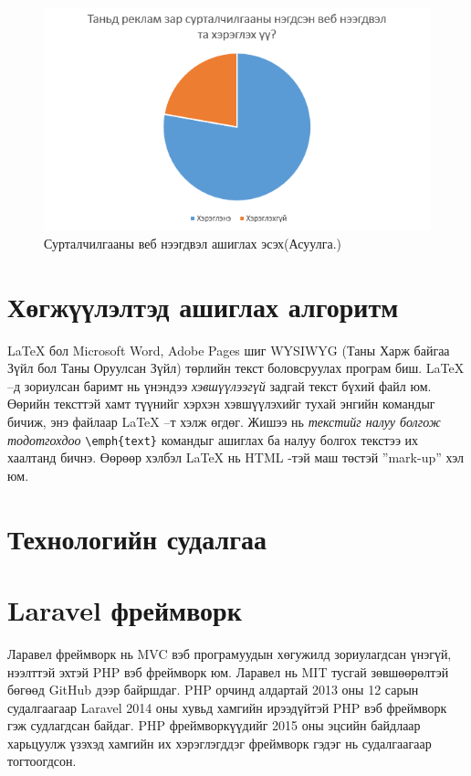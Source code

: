 \begin{figure}[htbp]
	\centering
	\includegraphics[scale=0.7]{Chart/Chart7}
	\caption[Хэрэглэгчийн судалгаа]{Сурталчилгааны веб нээгдвэл ашиглах эсэх(Асуулга.)}
	\label{fig:Chart7}
\end{figure}

\section{Хөгжүүлэлтэд ашиглах алгоритм}

\LaTeX{} бол Microsoft Word, Adobe Pages шиг \textsc{WYSIWYG} (Таны Харж байгаа Зүйл бол Таны Оруулсан Зүйл) төрлийн текст боловсруулах програм биш. \LaTeX{} --д зориулсан баримт нь үнэндээ \emph{хэвшүүлээгүй} задгай текст бүхий файл юм. Өөрийн тексттэй хамт түүнийг хэрхэн хэвшүүлэхийг тухай энгийн командыг бичиж, энэ файлаар \LaTeX{} --т хэлж өгдөг. Жишээ нь \emph{текстийг налуу болгож тодотгохдоо} \verb|\emph{text}| командыг ашиглах ба налуу болгох текстээ их хаалтанд бичнэ. Өөрөөр хэлбэл \LaTeX{} нь HTML -тэй маш төстэй ''{mark-up}'' хэл юм.


\section{Технологийн судалгаа}

\section{Laravel фреймворк}
Ларавел фреймворк нь  MVC вэб програмуудын хөгужилд зориулагдсан үнэгүй, нээлттэй эхтэй PHP вэб фреймворк юм. Ларавел нь MIT тусгай зөвшөөрөлтэй бөгөөд GitHub дээр байршдаг. PHP орчинд алдартай 2013 оны 12 сарын судалгаагаар Laravel  2014 оны хувьд хамгийн ирээдүйтэй PHP вэб фреймворк гэж судлагдсан байдаг.
PHP фреймворкүүдийг 2015 оны эцсийн байдлаар харьцуулж үзэхэд  хамгийн их хэрэглэгддэг фреймворк гэдэг нь судалгаагаар тогтоогдсон.

